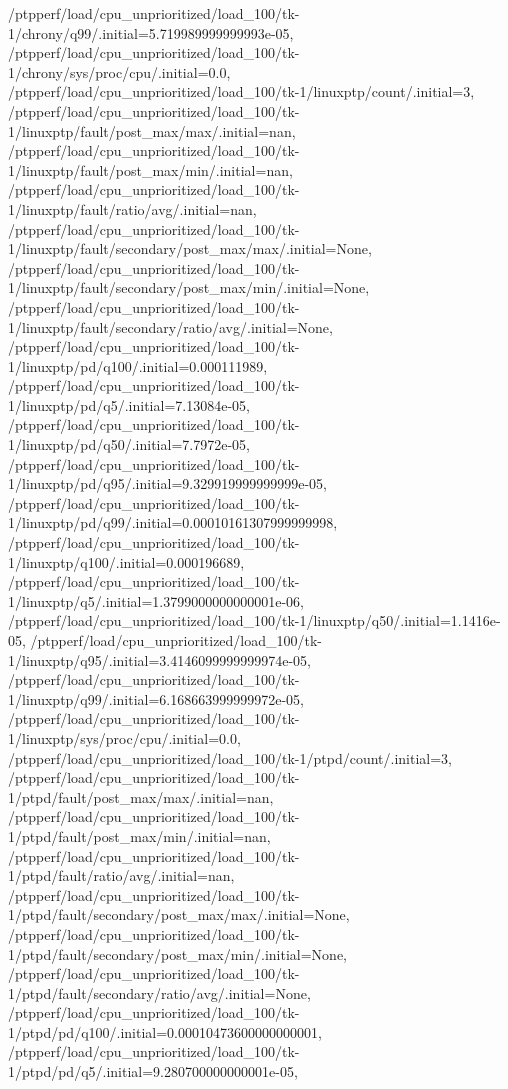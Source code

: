 {    /ptpperf/load/cpu_unprioritized/load_100/tk-1/chrony/q99/.initial=5.719989999999993e-05,
    /ptpperf/load/cpu_unprioritized/load_100/tk-1/chrony/sys/proc/cpu/.initial=0.0,
    /ptpperf/load/cpu_unprioritized/load_100/tk-1/linuxptp/count/.initial=3,
    /ptpperf/load/cpu_unprioritized/load_100/tk-1/linuxptp/fault/post_max/max/.initial=nan,
    /ptpperf/load/cpu_unprioritized/load_100/tk-1/linuxptp/fault/post_max/min/.initial=nan,
    /ptpperf/load/cpu_unprioritized/load_100/tk-1/linuxptp/fault/ratio/avg/.initial=nan,
    /ptpperf/load/cpu_unprioritized/load_100/tk-1/linuxptp/fault/secondary/post_max/max/.initial=None,
    /ptpperf/load/cpu_unprioritized/load_100/tk-1/linuxptp/fault/secondary/post_max/min/.initial=None,
    /ptpperf/load/cpu_unprioritized/load_100/tk-1/linuxptp/fault/secondary/ratio/avg/.initial=None,
    /ptpperf/load/cpu_unprioritized/load_100/tk-1/linuxptp/pd/q100/.initial=0.000111989,
    /ptpperf/load/cpu_unprioritized/load_100/tk-1/linuxptp/pd/q5/.initial=7.13084e-05,
    /ptpperf/load/cpu_unprioritized/load_100/tk-1/linuxptp/pd/q50/.initial=7.7972e-05,
    /ptpperf/load/cpu_unprioritized/load_100/tk-1/linuxptp/pd/q95/.initial=9.329919999999999e-05,
    /ptpperf/load/cpu_unprioritized/load_100/tk-1/linuxptp/pd/q99/.initial=0.00010161307999999998,
    /ptpperf/load/cpu_unprioritized/load_100/tk-1/linuxptp/q100/.initial=0.000196689,
    /ptpperf/load/cpu_unprioritized/load_100/tk-1/linuxptp/q5/.initial=1.3799000000000001e-06,
    /ptpperf/load/cpu_unprioritized/load_100/tk-1/linuxptp/q50/.initial=1.1416e-05,
    /ptpperf/load/cpu_unprioritized/load_100/tk-1/linuxptp/q95/.initial=3.4146099999999974e-05,
    /ptpperf/load/cpu_unprioritized/load_100/tk-1/linuxptp/q99/.initial=6.168663999999972e-05,
    /ptpperf/load/cpu_unprioritized/load_100/tk-1/linuxptp/sys/proc/cpu/.initial=0.0,
    /ptpperf/load/cpu_unprioritized/load_100/tk-1/ptpd/count/.initial=3,
    /ptpperf/load/cpu_unprioritized/load_100/tk-1/ptpd/fault/post_max/max/.initial=nan,
    /ptpperf/load/cpu_unprioritized/load_100/tk-1/ptpd/fault/post_max/min/.initial=nan,
    /ptpperf/load/cpu_unprioritized/load_100/tk-1/ptpd/fault/ratio/avg/.initial=nan,
    /ptpperf/load/cpu_unprioritized/load_100/tk-1/ptpd/fault/secondary/post_max/max/.initial=None,
    /ptpperf/load/cpu_unprioritized/load_100/tk-1/ptpd/fault/secondary/post_max/min/.initial=None,
    /ptpperf/load/cpu_unprioritized/load_100/tk-1/ptpd/fault/secondary/ratio/avg/.initial=None,
    /ptpperf/load/cpu_unprioritized/load_100/tk-1/ptpd/pd/q100/.initial=0.00010473600000000001,
    /ptpperf/load/cpu_unprioritized/load_100/tk-1/ptpd/pd/q5/.initial=9.280700000000001e-05,
}
